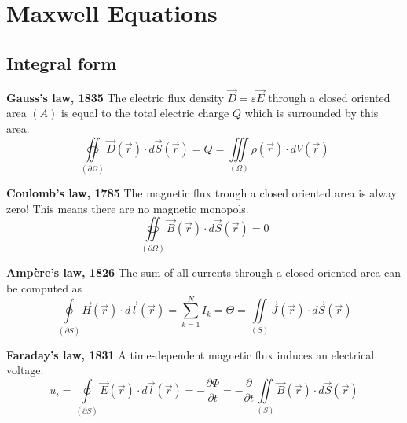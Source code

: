 \section{Maxwell Equations}

\subsection{Integral form}
\begin{multicols}{2}
	\textbf{Gauss's law, 1835\newline}
	\noindent The electric flux density $\vec{D} = \varepsilon \vec{E}$ through a closed oriented area $(A)$ is equal to the total electric charge $Q$ which is surrounded by this area.
	\begin{equation}
		\oiint\limits_{\left(\partial\Omega\right)} \vec{D}\left(\vec{r}\right)\cdot d\vec{S}\left(\vec{r}\right) = Q = \iiint\limits_{\left(\Omega\right)}\rho\left(\vec{r}\right)\cdot dV\left(\vec{r}\right)
		\label{eq:MaxwellInt1}
	\end{equation}
	
	\textbf{Coulomb's law, 1785\newline}
	\noindent The magnetic flux trough a closed oriented area is alway zero! This means there are no magnetic monopols.
	\begin{equation}
		\oiint\limits_{\left(\partial\Omega\right)} \vec{B}\left(\vec{r}\right)\cdot d\vec{S}\left(\vec{r}\right) = 0
		\label{eq:MaxwellInt2}
	\end{equation}
	
	\textbf{Ampère's law, 1826\newline}
	The sum of all currents through a closed oriented area can be computed as
	\begin{equation}
		\oint\limits_{\left(\partial S\right)} \vec{H}\left(\vec{r}\right)\cdot d\vec{l}\left(\vec{r}\right) = \sum_{k=1}^{N} I_k = \Theta =  \iint\limits_{\left(S\right)}\vec{J}\left(\vec{r}\right)\cdot d\vec{S}\left(\vec{r}\right)
		\label{eq:MaxwellInt3}
	\end{equation}
	
	\textbf{Faraday's law, 1831\newline}
	A time-dependent magnetic flux induces an electrical voltage.
	\begin{equation}
		u_i = \oint\limits_{\left(\partial S\right)} \vec{E}\left(\vec{r}\right)\cdot d\vec{l}\left(\vec{r}\right) = -\frac{\partial \Phi}{\partial t} = -\frac{\partial}{\partial t} \iint\limits_{\left(S\right)} \vec{B}\left(\vec{r}\right)\cdot d\vec{S}\left(\vec{r}\right)
		\label{eq:MaxwellInt4} 
	\end{equation}
\end{multicols}


